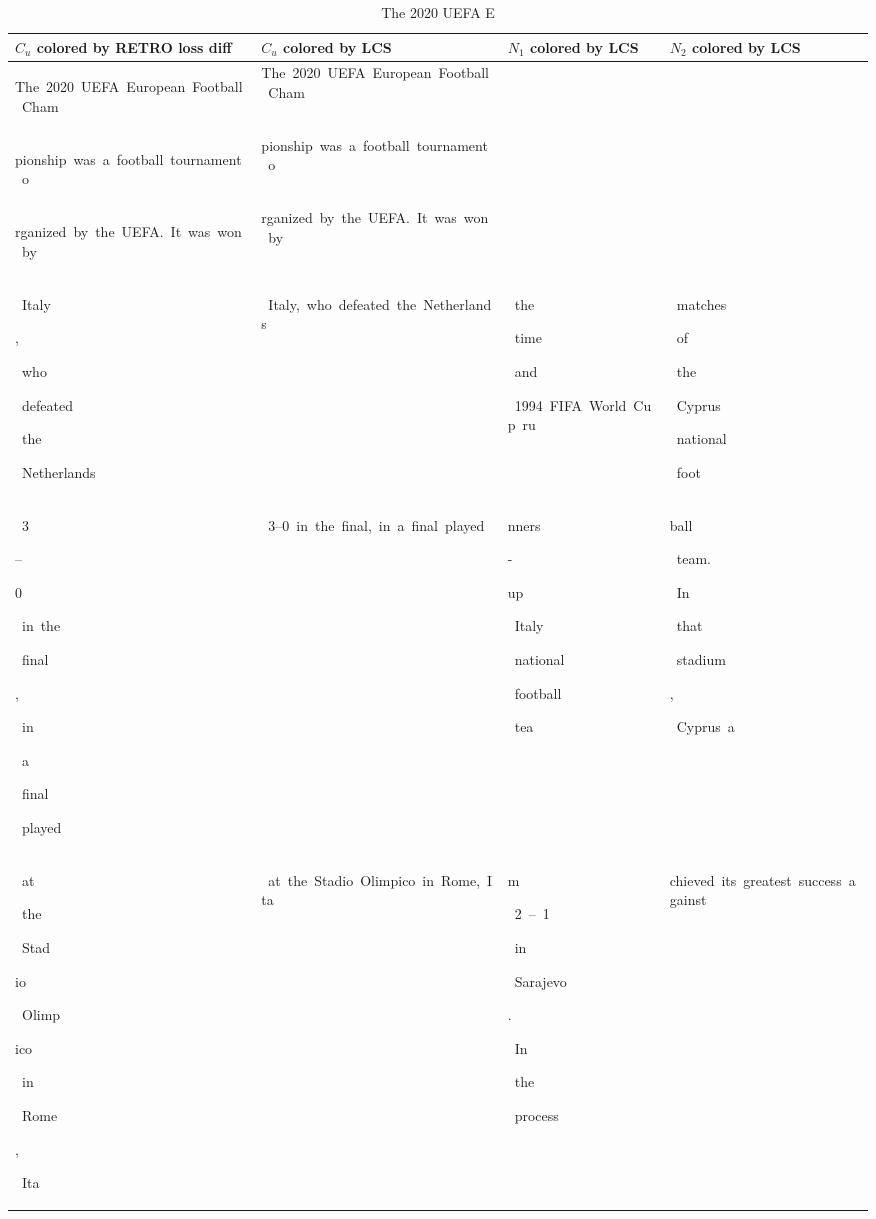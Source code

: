    \begin{table}[h]       \tiny       \caption{The 2020 UEFA E       }       \vspace{2.0mm}       \centering       \begin{tabular}{ l | l | l | l }$C_u$ colored by RETRO loss diff & $C_u$ colored by LCS & $N_1$ colored by LCS & $N_2$ colored by LCS \\ \hline\colorbox{cm_32!40}{\strut The\ 2020\ UEFA\ European\ Football\ Cham} & The\ 2020\ UEFA\ European\ Football\ Cham & \colorbox{cm_0!40}{\strut \ } & \colorbox{cm_0!40}{\strut \ } \\ 
 \colorbox{cm_32!40}{\strut pionship\ was\ a\ football\ tournament\ o} & pionship\ was\ a\ football\ tournament\ o &  &  \\ 
 \colorbox{cm_32!40}{\strut rganized\ by\ the\ UEFA.\ It\ was\ won\ by} & rganized\ by\ the\ UEFA.\ It\ was\ won\ by &  &  \\ 
  \hline \colorbox{cm_0!40}{\strut \ Italy}\colorbox{cm_34!40}{\strut ,}\colorbox{cm_46!40}{\strut \ who}\colorbox{cm_63!40}{\strut \ defeated}\colorbox{cm_14!40}{\strut \ the}\colorbox{cm_42!40}{\strut \ Netherlands} & \colorbox{cm_0!40}{\strut \ Italy,\ who\ defeated\ the\ Netherlands} & \colorbox{cm_12!40}{\strut \ the}\colorbox{cm_0!40}{\strut \ time}\colorbox{cm_12!40}{\strut \ and}\colorbox{cm_0!40}{\strut \ 1994\ FIFA\ World\ Cup\ ru} & \colorbox{cm_0!40}{\strut \ matches}\colorbox{cm_12!40}{\strut \ of}\colorbox{cm_25!40}{\strut \ the}\colorbox{cm_0!40}{\strut \ Cyprus}\colorbox{cm_12!40}{\strut \ national}\colorbox{cm_0!40}{\strut \ foot} \\ 
 \colorbox{cm_8!40}{\strut \ 3}\colorbox{cm_18!40}{\strut –}\colorbox{cm_0!40}{\strut 0}\colorbox{cm_32!40}{\strut \ in\ the}\colorbox{cm_34!40}{\strut \ final}\colorbox{cm_42!40}{\strut ,}\colorbox{cm_22!40}{\strut \ in}\colorbox{cm_33!40}{\strut \ a}\colorbox{cm_0!40}{\strut \ final}\colorbox{cm_36!40}{\strut \ played} & \colorbox{cm_0!40}{\strut \ 3–0\ in\ the\ final,\ in\ a\ final\ played} & \colorbox{cm_0!40}{\strut nners}\colorbox{cm_12!40}{\strut -}\colorbox{cm_0!40}{\strut up}\colorbox{cm_12!40}{\strut \ Italy}\colorbox{cm_25!40}{\strut \ national}\colorbox{cm_0!40}{\strut \ football}\colorbox{cm_12!40}{\strut \ tea} & \colorbox{cm_0!40}{\strut ball}\colorbox{cm_12!40}{\strut \ team.}\colorbox{cm_0!40}{\strut \ In}\colorbox{cm_12!40}{\strut \ that}\colorbox{cm_0!40}{\strut \ stadium}\colorbox{cm_12!40}{\strut ,}\colorbox{cm_0!40}{\strut \ Cyprus\ a} \\ 
 \colorbox{cm_41!40}{\strut \ at}\colorbox{cm_24!40}{\strut \ the}\colorbox{cm_7!40}{\strut \ Stad}\colorbox{cm_31!40}{\strut io}\colorbox{cm_34!40}{\strut \ Olimp}\colorbox{cm_32!40}{\strut ico}\colorbox{cm_31!40}{\strut \ in}\colorbox{cm_32!40}{\strut \ Rome}\colorbox{cm_0!40}{\strut ,}\colorbox{cm_30!40}{\strut \ Ita} & \colorbox{cm_0!40}{\strut \ at\ the\ Stadio\ Olimpico\ in\ Rome,\ Ita} & \colorbox{cm_12!40}{\strut m}\colorbox{cm_0!40}{\strut \ 2\ –\ 1}\colorbox{cm_12!40}{\strut \ in}\colorbox{cm_0!40}{\strut \ Sarajevo}\colorbox{cm_12!40}{\strut .}\colorbox{cm_0!40}{\strut \ In}\colorbox{cm_12!40}{\strut \ the}\colorbox{cm_0!40}{\strut \ process\ } & \colorbox{cm_0!40}{\strut chieved\ its\ greatest\ success\ against} \\ 

\end{tabular}
\end{table}
